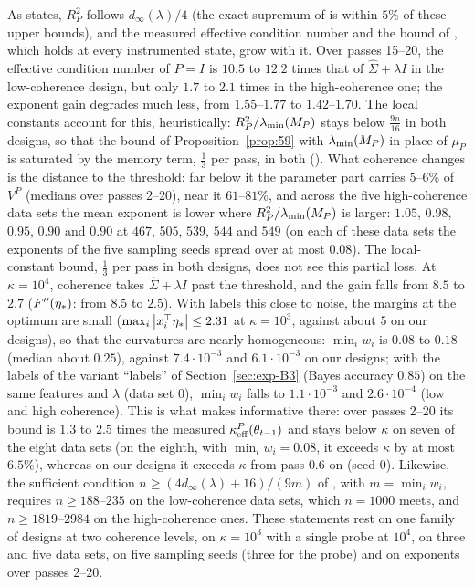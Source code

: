 As  states, $R_P^2$ follows $d_\infty(\lambda)/4$ (the exact supremum of
 is within $5\%$ of these upper bounds), and the measured effective condition number and the bound
of , which holds at every instrumented state, grow with it. Over passes 15--20, the effective
condition number of $P=I$ is $10.5$ to $12.2$ times that of $\hat\Sigma+\lambda I$ in the low-coherence design, but only
$1.7$ to $2.1$ times in the high-coherence one; the exponent gain degrades much less, from $1.55$--$1.77$ to
$1.42$--$1.70$. The local constants account for this, heuristically: $R_P^2/\lambda_{\min}(M_P)$ stays below $\frac{9n}{16}$ in
both designs, so that the bound of Proposition~\ref{prop:59} with $\lambda_{\min}(M_P)$ in place of $\mu_P$ is saturated by the
memory term, $\frac13$ per pass, in both (). What coherence changes is the distance to
the threshold: far below it the parameter part carries $5$--$6\%$ of $V^P$ (medians over passes 2--20), near it
$61$--$81\%$, and across the five high-coherence data sets the mean exponent is lower where $R_P^2/\lambda_{\min}(M_P)$ is larger:
$1.05$, $0.98$, $0.95$, $0.90$ and $0.90$ at $467$, $505$, $539$, $544$ and $549$ (on each of these data sets the
exponents of the five sampling seeds spread over at most $0.08$). The local-constant bound, $\frac13$ per pass in both
designs, does not see this partial loss. At $\kappa=10^4$, coherence takes $\hat\Sigma+\lambda I$ past the threshold, and the gain falls from $8.5$ to $2.7$
($F''(\eta_\ast)$: from $8.5$ to $2.5$). With labels this close to noise, the margins at the optimum are small
($\max_i\left|x_i^\top\eta_\ast\right|\le2.31$ at $\kappa=10^3$, against about $5$ on our designs), so that the curvatures are nearly
homogeneous: $\min_iw_i$ is $0.08$ to $0.18$ (median about $0.25$), against $7.4\cdot10^{-3}$ and $6.1\cdot10^{-3}$ on our
designs; with the labels of the variant ``labels'' of Section~\ref{sec:exp-B3} (Bayes accuracy $0.85$) on the same
features and $\lambda$ (data set $0$), $\min_iw_i$ falls to $1.1\cdot10^{-3}$ and $2.6\cdot10^{-4}$ (low and high
coherence). This is what makes  informative there: over passes 2--20 its bound is $1.3$ to $2.5$
times the measured $\kappa^P_{\rm eff}(\theta_{t-1})$ and stays below $\kappa$ on seven of the eight data sets (on the
eighth, with $\min_iw_i=0.08$, it exceeds $\kappa$ by at most $6.5\%$), whereas on our designs it exceeds $\kappa$ from
pass $0.6$ on (seed $0$). Likewise, the sufficient condition $n\ge(4d_\infty(\lambda)+16)/(9m)$ of
, with $m=\min_iw_i$, requires $n\ge188$--$235$ on the low-coherence data sets, which
$n=1000$ meets, and $n\ge1819$--$2984$ on the high-coherence ones. These statements rest on one family of designs at two
coherence levels, on $\kappa=10^3$ with a single probe at $10^4$, on three and five data sets, on five sampling seeds
(three for the probe) and on exponents over passes 2--20.
